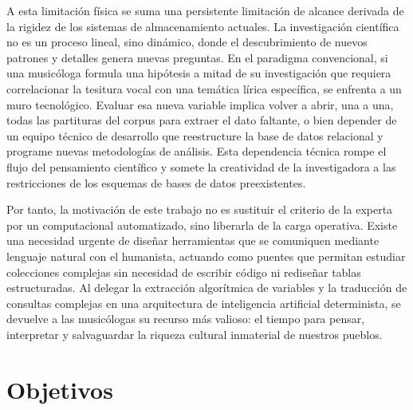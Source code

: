 A esta limitación física se suma una persistente limitación de alcance derivada de la rigidez de los sistemas de almacenamiento actuales. La investigación científica no es un proceso lineal, sino dinámico, donde el descubrimiento de nuevos patrones y detalles genera nuevas preguntas. En el paradigma convencional, si una musicóloga formula una hipótesis a mitad de su investigación que requiera correlacionar la tesitura vocal con una temática lírica específica, se enfrenta a un muro tecnológico. Evaluar esa nueva variable implica volver a abrir, una a una, todas las partituras del corpus para extraer el dato faltante, o bien depender de un equipo técnico de desarrollo que reestructure la base de datos relacional y programe nuevas metodologías de análisis. Esta dependencia técnica rompe el flujo del pensamiento científico y somete la creatividad de la investigadora a las restricciones de los esquemas de bases de datos preexistentes.

Por tanto, la motivación de este trabajo no es sustituir el criterio de la experta por un computacional automatizado, sino liberarla de la carga operativa. Existe una necesidad urgente de diseñar herramientas que se comuniquen mediante lenguaje natural con el humanista, actuando como puentes que permitan estudiar colecciones complejas sin necesidad de escribir código ni rediseñar tablas estructuradas. Al delegar la extracción algorítmica de variables y la traducción de consultas complejas en una arquitectura de inteligencia artificial determinista, se devuelve a las musicólogas su recurso más valioso: el tiempo para pensar, interpretar y salvaguardar la riqueza cultural inmaterial de nuestros pueblos.



\section{Objetivos}

